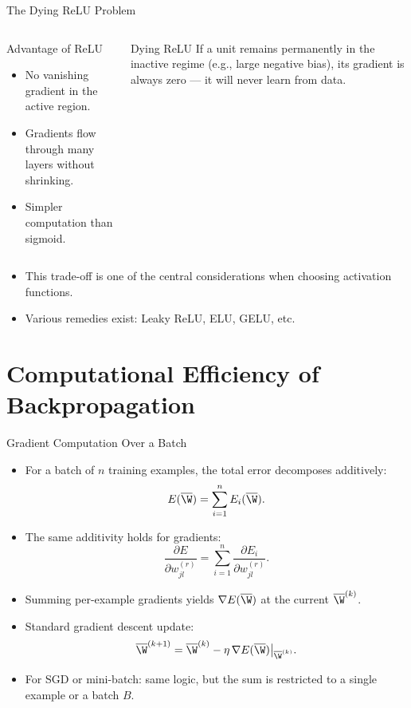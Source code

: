 \begin{frame}{The Dying ReLU Problem}
  \begin{columns}[t]
      \begin{block}{Advantage of ReLU}
        \begin{itemize}
          \item No vanishing gradient in the active region.
          \item Gradients flow through many layers without shrinking.
          \item Simpler computation than sigmoid.
        \end{itemize}
      \end{block}
      \begin{alertblock}{Dying ReLU}
        If a unit remains permanently in the inactive regime (e.g., large negative bias), its
        gradient is always zero — it will \alert{never learn} from data.
      \end{alertblock}
  \end{columns}
  \medskip
  \begin{itemize}
    \item This trade-off is one of the central considerations when choosing activation functions.
    \item Various remedies exist: Leaky ReLU, ELU, GELU, etc.
  \end{itemize}
\end{frame}

\section{Computational Efficiency of Backpropagation}

\begin{frame}{Gradient Computation Over a Batch}
  \begin{itemize}
    \item For a batch of $n$ training examples, the total error decomposes additively:
    \[
      E(\overline{\W}) = \sum_{i=1}^{n} E_i(\overline{\W}).
    \]
    \item The same additivity holds for gradients:
    \[
      \frac{\partial E}{\partial w_{jl}^{(r)}} = \sum_{i=1}^{n} \frac{\partial E_i}{\partial w_{jl}^{(r)}}.
    \]
    \item Summing per-example gradients yields $\nabla E(\overline{\W})$ at the current $\overline{\W}^{(k)}$.
    \item Standard gradient descent update:
    \[
      \overline{\W}^{(k+1)} = \overline{\W}^{(k)} - \eta\,\nabla E(\overline{\W})\big|_{\overline{\W}^{(k)}}.
    \]
    \item For SGD or mini-batch: same logic, but the sum is restricted to a single example or a batch $B$.
  \end{itemize}
\end{frame}

